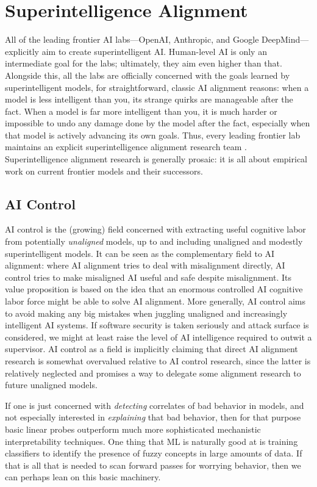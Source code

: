 \section{Superintelligence Alignment}
All of the leading frontier AI labs---OpenAI, Anthropic, and Google
DeepMind---explicitly aim to create superintelligent AI. Human-level AI is only
an intermediate goal for the labs; ultimately, they aim even higher than that.
Alongside this, all the labs are officially concerned with the goals learned by
superintelligent models, for straightforward, classic AI alignment reasons:
when a model is less intelligent than you, its strange quirks are manageable
after the fact. When a model is far more intelligent than you, it is much
harder or impossible to undo any damage done by the model after the fact,
especially when that model is actively advancing its own goals. Thus, every
leading frontier lab maintains an explicit superintelligence alignment research
team \cite{leike2023superalignment,anthropic2025rsp}. Superintelligence
alignment research is generally prosaic: it is all about empirical work on
current frontier models and their successors.

\subsection{AI Control}
AI control \cite{greenblatt2024aicontrol} is the (growing) field concerned with
extracting useful cognitive labor from potentially \emph{unaligned} models, up
to and including unaligned and modestly superintelligent models. It can be seen
as the complementary field to AI alignment: where AI alignment tries to deal
with misalignment directly, AI control tries to make misaligned AI useful and
safe despite misalignment. Its value proposition is based on the idea that an
enormous controlled AI cognitive labor force might be able to solve AI
alignment. More generally, AI control aims to avoid making any big mistakes
when juggling unaligned and increasingly intelligent AI systems. If software
security is taken seriously and attack surface is considered, we might at least
raise the level of AI intelligence required to outwit a supervisor. AI control
as a field is implicitly claiming that direct AI alignment research is somewhat
overvalued relative to AI control research, since the latter is relatively
neglected and promises a way to delegate some alignment research to future
unaligned models.

If one is just concerned with \emph{detecting} correlates of bad behavior in
models, and not especially interested in \emph{explaining} that bad behavior,
then for that purpose basic linear probes outperform much more sophisticated
mechanistic interpretability techniques. One thing that ML is naturally good at
is training classifiers to identify the presence of fuzzy concepts in large
amounts of data. If that is all that is needed to scan forward passes for
worrying behavior, then we can perhaps lean on this basic machinery.


